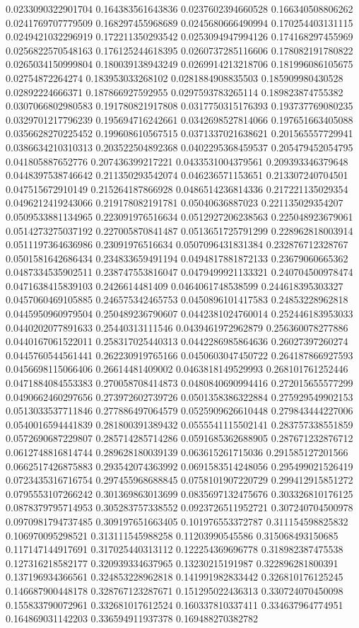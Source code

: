 \begin{table}
\begin{tabu}
\begin{sparkline}{10}
0.0233090322901704 0.164383561643836 0.0237602394660528 0.166340508806262 0.0241769707779509 0.168297455968689 0.0245680666490994 0.170254403131115 0.0249421032296919 0.172211350293542 0.0253094947994126 0.174168297455969 0.0256822570548163 0.176125244618395 0.0260737285116606 0.178082191780822 0.0265034150999804 0.180039138943249 0.0269914213218706 0.181996086105675 0.02754872264274 0.183953033268102 0.0281884908835503 0.185909980430528 0.02892224666371 0.187866927592955 0.0297593783265114 0.189823874755382 0.0307066802980583 0.191780821917808 0.0317750315176393 0.193737769080235 0.0329701217796239 0.195694716242661 0.0342698527814066 0.197651663405088 0.0356628270225452 0.199608610567515 0.0371337021638621 0.201565557729941 0.0386634210310313 0.203522504892368 0.0402295368459537 0.205479452054795 0.041805887652776 0.207436399217221 0.0433531004379561 0.209393346379648 0.0448397538746642 0.211350293542074 0.046236571153651 0.213307240704501 0.047515672910149 0.215264187866928 0.0486514236814336 0.217221135029354 0.0496212419243066 0.219178082191781 0.05040636887023 0.221135029354207 0.0509533881134965 0.223091976516634 0.0512927206238563 0.225048923679061 0.0514273275037192 0.227005870841487 0.0513651725791299 0.228962818003914 0.0511197364636986 0.23091976516634 0.0507096431831384 0.232876712328767 0.0501581642686434 0.234833659491194 0.0494817881872133 0.23679060665362 0.0487334535902511 0.238747553816047 0.0479499921133321 0.240704500978474 0.0471638415839103 0.2426614481409 0.0464061748538599 0.244618395303327 0.0457060469105885 0.246575342465753 0.0450896101417583 0.24853228962818 0.0445950960979504 0.250489236790607 0.0442381024760014 0.252446183953033 0.0440202077891633 0.25440313111546 0.0439461972962879 0.256360078277886 0.0440167061522011 0.258317025440313 0.0442286985864636 0.26027397260274 0.0445760544561441 0.262230919765166 0.0450603047450722 0.264187866927593 0.0456698115066406 0.26614481409002 0.0463818149529993 0.268101761252446 0.0471884084553383 0.270058708414873 0.0480840690994416 0.272015655577299 0.0490662460297656 0.273972602739726 0.0501358386322884 0.275929549902153 0.0513033537711846 0.277886497064579 0.0525909626610448 0.279843444227006 0.0540016594441839 0.281800391389432 0.0555541115502141 0.283757338551859 0.0572690687229807 0.285714285714286 0.0591685362688905 0.287671232876712 0.0612748816814744 0.289628180039139 0.063615261715036 0.291585127201566 0.0662517426875883 0.293542074363992 0.0691583514248056 0.295499021526419 0.0723435316716754 0.297455968688845 0.0758101907220729 0.299412915851272 0.0795553107266242 0.301369863013699 0.0835697132475676 0.303326810176125 0.0878379795714953 0.305283757338552 0.0923726511952721 0.307240704500978 0.0970981794737485 0.309197651663405 0.101976553372787 0.311154598825832 0.106970095298521 0.313111545988258 0.11203990545586 0.315068493150685 0.117147144917691 0.317025440313112 0.122254369696778 0.318982387475538 0.127316218582177 0.320939334637965 0.13230215191987 0.322896281800391 0.137196934366561 0.324853228962818 0.141991982833442 0.326810176125245 0.146687900448178 0.328767123287671 0.151295022436313 0.330724070450098 0.155833790072961 0.332681017612524 0.160337810337411 0.334637964774951 0.164869031142203 0.336594911937378 0.169488270382782 
\end{sparkline}
\end{tabu}
\end{table}
